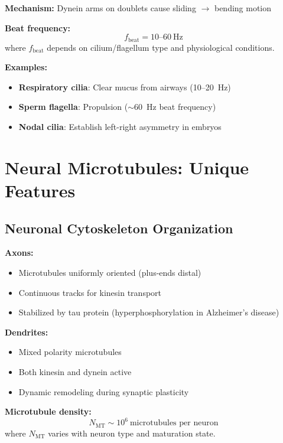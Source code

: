 \textbf{Mechanism:} Dynein arms on doublets cause sliding $\rightarrow$ bending motion

\textbf{Beat frequency:}
\begin{equation}
f_{\mathrm{beat}} = 10\text{--}60\ \mathrm{Hz}
\end{equation}
where $f_{\mathrm{beat}}$ depends on cilium/flagellum type and physiological conditions.

\textbf{Examples:}
\begin{itemize}
\item \textbf{Respiratory cilia}: Clear mucus from airways (10--20~Hz)
\item \textbf{Sperm flagella}: Propulsion ($\sim$60~Hz beat frequency)
\item \textbf{Nodal cilia}: Establish left-right asymmetry in embryos
\end{itemize}

\section{Neural Microtubules: Unique Features}

\subsection{Neuronal Cytoskeleton Organization}

\textbf{Axons:}
\begin{itemize}
\item Microtubules uniformly oriented (plus-ends distal)
\item Continuous tracks for kinesin transport
\item Stabilized by tau protein (hyperphosphorylation in Alzheimer's disease)
\end{itemize}

\textbf{Dendrites:}
\begin{itemize}
\item Mixed polarity microtubules
\item Both kinesin and dynein active
\item Dynamic remodeling during synaptic plasticity
\end{itemize}

\textbf{Microtubule density:}
\begin{equation}
N_{\mathrm{MT}} \sim 10^6\ \text{microtubules per neuron}
\end{equation}
where $N_{\mathrm{MT}}$ varies with neuron type and maturation state.

